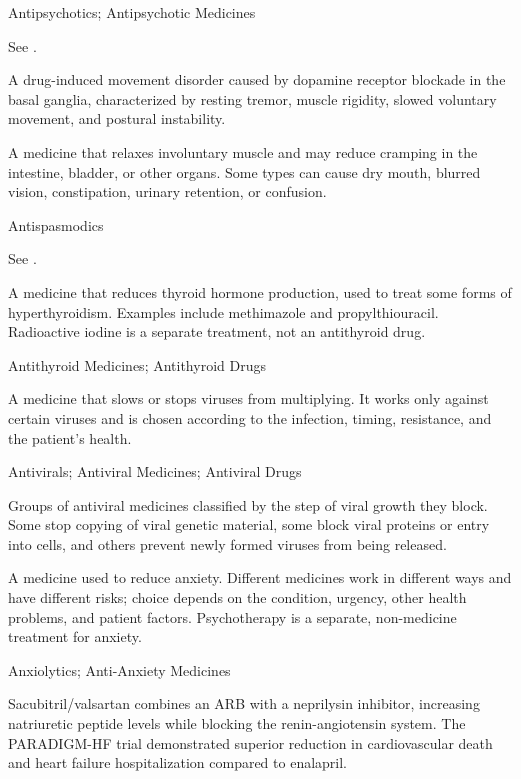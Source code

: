\synonyms
Antipsychotics; Antipsychotic Medicines

 See .

 A drug-induced movement disorder caused by dopamine receptor blockade in the basal ganglia, characterized by resting tremor, muscle rigidity, slowed voluntary movement, and postural instability.

 A medicine that relaxes involuntary muscle and may reduce cramping in the intestine, bladder, or other organs. Some types can cause dry mouth, blurred vision, constipation, urinary retention, or confusion.

\synonyms
Antispasmodics

 See .

 A medicine that reduces thyroid hormone production, used to treat some forms of hyperthyroidism. Examples include methimazole and propylthiouracil. Radioactive iodine is a separate treatment, not an antithyroid drug.

\synonyms
Antithyroid Medicines; Antithyroid Drugs

 A medicine that slows or stops viruses from multiplying. It works only against certain viruses and is chosen according to the infection, timing, resistance, and the patient’s health.

\synonyms
Antivirals; Antiviral Medicines; Antiviral Drugs

 Groups of antiviral medicines classified by the step of viral growth they block. Some stop copying of viral genetic material, some block viral proteins or entry into cells, and others prevent newly formed viruses from being released.

 A medicine used to reduce anxiety. Different medicines work in different ways and have different risks; choice depends on the condition, urgency, other health problems, and patient factors. Psychotherapy is a separate, non-medicine treatment for anxiety.

\synonyms
Anxiolytics; Anti-Anxiety Medicines

 Sacubitril/valsartan combines an ARB with a neprilysin inhibitor, increasing natriuretic
peptide levels while blocking the renin-angiotensin system. The PARADIGM-HF trial
demonstrated superior reduction in cardiovascular death and heart failure
hospitalization compared to enalapril.


